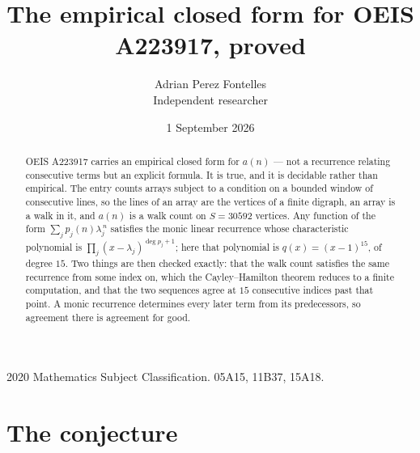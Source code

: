 \documentclass[11pt,a4paper]{article}
\title{The empirical closed form for OEIS A223917, proved}
\author{Adrian Perez Fontelles\\ \small Independent researcher}
\date{1 September 2026}
\theoremstyle{plain}
\theoremstyle{definition}
\begin{document}
\maketitle

\begin{abstract}
OEIS A223917 carries an empirical closed form for $a(n)$ --- not a recurrence relating
consecutive terms but an explicit formula. It is true, and it is decidable rather than
empirical. The entry counts arrays subject to a condition on a bounded window of consecutive lines, so the lines of an array are the
vertices of a finite digraph, an array is a walk in it, and $a(n)$ is a walk count on
$S=30592$ vertices. Any function of the form $\sum_j p_j(n)\lambda_j^{\,n}$ satisfies the
monic linear recurrence whose characteristic polynomial is
$\prod_j(x-\lambda_j)^{\deg p_j+1}$; here that polynomial is $q(x)=(x-1)^{15}$, of degree
$15$. Two things are then checked exactly: that the walk count satisfies the same
recurrence from some index on, which the Cayley--Hamilton theorem reduces to a finite
computation, and that the two sequences agree at $15$ consecutive indices past that
point. A monic recurrence determines every later term from its predecessors, so agreement
there is agreement for good.
\end{abstract}

\noindent\small 2020 Mathematics Subject Classification. 05A15, 11B37, 15A18.\normalsize

\section{The conjecture}
\end{document}
